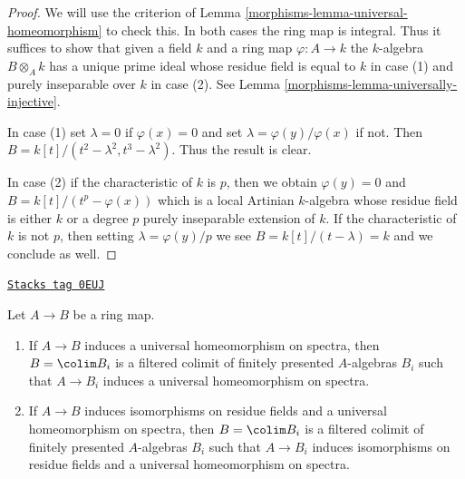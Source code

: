 \begin{proof}

We will use the criterion of Lemma \ref{morphisms-lemma-universal-homeomorphism}
to check this. In both cases the ring map is integral. Thus it suffices to show
that given a field $k$ and a ring map $\varphi : A \to k$
the $k$-algebra $B \otimes_A k$ has a unique prime ideal
whose residue field is equal to $k$ in case (1) and
purely inseparable over $k$ in case (2). See
Lemma \ref{morphisms-lemma-universally-injective}.

\medskip\noindent
In case (1) set $\lambda = 0$ if $\varphi(x) = 0$ and set
$\lambda = \varphi(y)/\varphi(x)$ if not. Then
$B = k[t]/(t^2 - \lambda^2, t^3 - \lambda^2)$.
Thus the result is clear.

\medskip\noindent
In case (2) if the characteristic of $k$ is $p$, then
we obtain $\varphi(y) = 0$ and $B = k[t]/(t^p - \varphi(x))$
which is a local Artinian $k$-algebra whose residue field
is either $k$ or a degree $p$ purely inseparable extension of $k$.
If the characteristic of $k$ is not $p$, then setting
$\lambda = \varphi(y)/p$ we see $B = k[t]/(t - \lambda) = k$
and we conclude as well.
\end{proof}

\begin{lemma}
\label{morphisms-lemma-universal-homeo-limit}
\href{https://stacks.math.columbia.edu/tag/0EUJ}{\texttt{Stacks tag 0EUJ}}

Let $A \to B$ be a ring map.
\begin{enumerate}
\item If $A \to B$ induces a universal homeomorphism on spectra,
then $B = \colim B_i$ is a filtered colimit of finitely presented $A$-algebras
$B_i$ such that $A \to B_i$ induces a universal homeomorphism on spectra.
\item If $A \to B$ induces isomorphisms on residue fields and
a universal homeomorphism on spectra, then $B = \colim B_i$ is a
filtered colimit of finitely presented $A$-algebras $B_i$ such that
$A \to B_i$ induces isomorphisms on residue fields and a
universal homeomorphism on spectra.
\end{enumerate}
\end{lemma}

